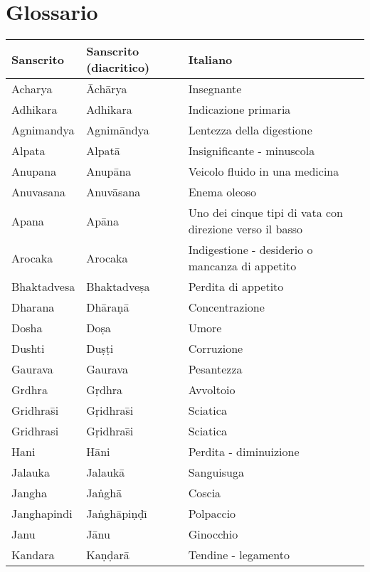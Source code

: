 
\chapter*{Glossario} 


\begin{longtable}{|p{3cm}|p{3cm}|p{10cm}|}
	\hline
    {\bf Sanscrito} & {\bf Sanscrito (diacritico)} & {\bf Italiano} \\ \hline

	\endhead %


Acharya & \={A}ch\={a}rya & Insegnante \\
Adhikara & Adhikara & Indicazione primaria \\
Agnimandya & Agnim\={a}ndya & Lentezza della digestione \\
Alpata & Alpat\={a} & Insignificante - minuscola \\
Anupana & Anup\={a}na & Veicolo fluido in una medicina \\
Anuvasana & Anuv\={a}sana & Enema oleoso \\
Apana & Ap\={a}na & Uno dei cinque tipi di vata con direzione verso il basso \\
Arocaka & Arocaka & Indigestione - desiderio o mancanza di appetito \\
Bhaktadvesa & Bhaktadve\d{s}a & Perdita di appetito \\
Dharana & Dh\={a}ra\d{n}\={a} & Concentrazione \\
Dosha & Do\d{s}a & Umore \\
Dushti & Du\d{s}\d{t}i & Corruzione \\
Gaurava & Gaurava & Pesantezza \\
Grdhra & G\d{r}dhra & Avvoltoio \\
Gridhra\={s}i & G\d{r}idhra\={s}i & Sciatica \\
Gridhrasi & G\d{r}idhra\={s}i & Sciatica \\
Hani & H\={a}ni & Perdita - diminuizione \\
Jalauka & Jalauk\={a} & Sanguisuga \\
Jangha & Ja\.{n}gh\={a} & Coscia \\
Janghapindi & Ja\.{n}gh\={a}pi\d{n}\d{d}\={\i} & Polpaccio \\
Janu & J\={a}nu & Ginocchio \\
Kandara & Ka\d{n}\d{d}ar\={a} & Tendine - legamento \\

\end{longtable}
